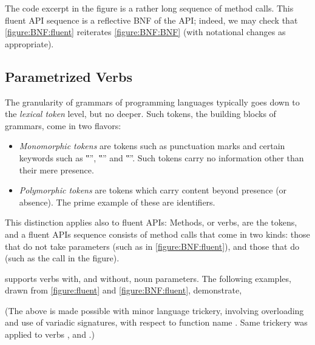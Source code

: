 The code excerpt in the figure is a rather long
sequence of method calls.
This fluent API sequence is a reflective BNF
of the \Fajita API;
indeed, we may check that \cref{figure:BNF:fluent} reiterates \cref{figure:BNF:BNF}
(with notational changes as appropriate).

\subsection{Parametrized Verbs}
The granularity of grammars of programming languages typically goes down to the \emph{lexical token} level,
but no deeper.
Such tokens, the building blocks of grammars, come in two flavors:
\begin{itemize}
  \item \emph{Monomorphic tokens} are tokens such as punctuation marks and
        certain keywords such as ‟”, ‟” and ‟”.
        Such tokens carry no information other than their mere presence.
  \item \emph{Polymorphic tokens} are tokens which carry content beyond
        presence (or absence). The prime example of these are identifiers.
\end{itemize}

This distinction applies also to fluent APIs:
Methods, or verbs, are the tokens, and a fluent APIs sequence consists of
method calls that come in two kinds: those that do not take parameters (such as  in \cref{figure:BNF:fluent}),
and those that do (such as the call  in the figure).

\Fajita supports verbs with, and without, noun parameters.
The following examples, drawn from \cref{figure:fluent} and \cref{figure:BNF:fluent},
demonstrate,
\begin{quote}
  \parbox[c]{30ex}{}
\end{quote}
(The above is made possible with minor \Java language trickery,
  involving overloading and use of variadic signatures,
  with respect to function name .
Same trickery was applied to verbs , and .)
